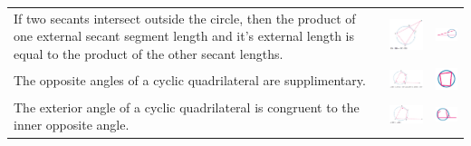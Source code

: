 \documentclass[a4paper,10pt]{report}
\begin{document}
\begin{center}
\begin{tabular}[center]{p{5cm}|p{3cm}|p{2cm}}
		If two secants intersect outside the circle, then the product of one external secant segment length and it's external length is equal to the product of the other secant lengths.                                            & \includegraphics[width=3cm]{circle theorem 13} & \includegraphics[width=2cm]{circle theorem 13 symbol} \\
		The opposite angles of a cyclic quadrilateral are supplimentary.                                                                                                                                                             & \includegraphics[width=3cm]{circle theorem 14} & \includegraphics[width=2cm]{circle theorem 14 symbol} \\
		The exterior angle of a cyclic quadrilateral is congruent to the inner opposite angle.                                                                                                                                       & \includegraphics[width=3cm]{circle theorem 15} & \includegraphics[width=2cm]{circle theorem 15 symbol}
	\end{tabular}
\end{center}
\end{document}
